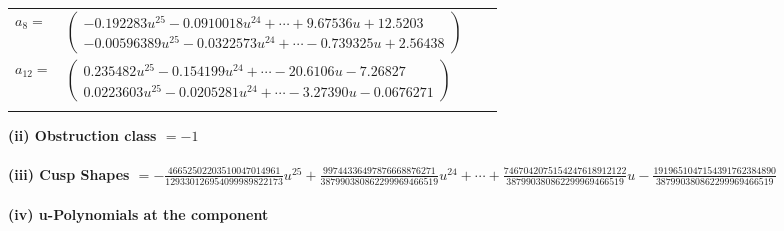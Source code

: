 \documentclass[1p]{elsarticle_modified}
\theoremstyle{definition}
\begin{document}
\begin{tabular}{m{7pt} m{180pt} m{7pt} m{180pt} }
\flushright $a_{8}=$&$\begin{pmatrix}-0.192283 u^{25}-0.0910018 u^{24}+\cdots+9.67536 u+12.5203\\-0.00596389 u^{25}-0.0322573 u^{24}+\cdots-0.739325 u+2.56438\end{pmatrix}$ \\
\flushright $a_{12}=$&$\begin{pmatrix}0.235482 u^{25}-0.154199 u^{24}+\cdots-20.6106 u-7.26827\\0.0223603 u^{25}-0.0205281 u^{24}+\cdots-3.27390 u-0.0676271\end{pmatrix}$\\&\end{tabular}
\flushleft \textbf{(ii) Obstruction class $= -1$}\\~\\
\flushleft \textbf{(iii) Cusp Shapes $= -\frac{46652502203510047014961}{129330126954099989822173} u^{25}+\frac{99744336497876668876271}{387990380862299969466519} u^{24}+\cdots+\frac{7467042075154247618912122}{387990380862299969466519} u-\frac{1919651047154391762384890}{387990380862299969466519}$}\\~\\
\newpage\renewcommand{\arraystretch}{1}
\flushleft \textbf{(iv) u-Polynomials at the component}\newline \\
\end{document}
